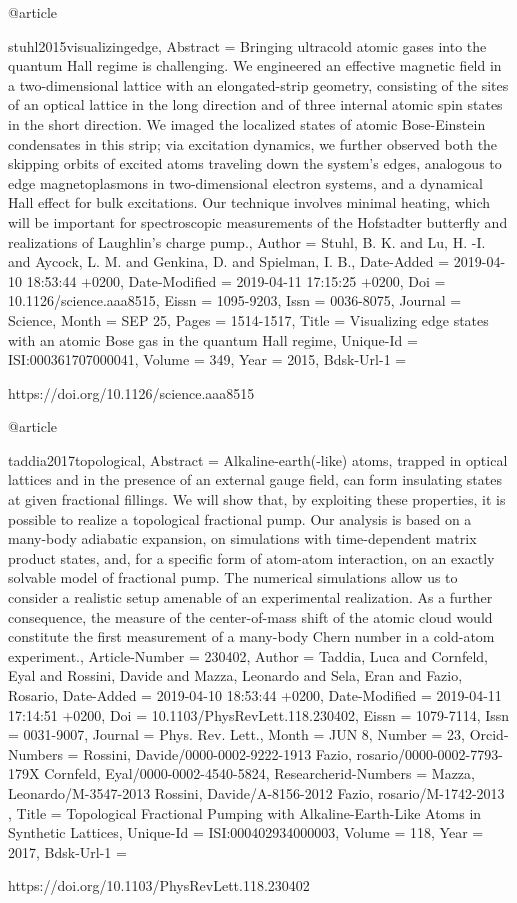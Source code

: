 \documentclass[epj,final]{svjour}
\begin{document}
{{{{{{{{{{{{{@article{stuhl2015visualizingedge,
	Abstract = {{Bringing ultracold atomic gases into the quantum Hall regime is
   challenging. We engineered an effective magnetic field in a
   two-dimensional lattice with an elongated-strip geometry, consisting of
   the sites of an optical lattice in the long direction and of three
   internal atomic spin states in the short direction. We imaged the
   localized states of atomic Bose-Einstein condensates in this strip; via
   excitation dynamics, we further observed both the skipping orbits of
   excited atoms traveling down the system's edges, analogous to edge
   magnetoplasmons in two-dimensional electron systems, and a dynamical
   Hall effect for bulk excitations. Our technique involves minimal
   heating, which will be important for spectroscopic measurements of the
   Hofstadter butterfly and realizations of Laughlin's charge pump.}},
	Author = {Stuhl, B. K. and Lu, H. -I. and Aycock, L. M. and Genkina, D. and Spielman, I. B.},
	Date-Added = {2019-04-10 18:53:44 +0200},
	Date-Modified = {2019-04-11 17:15:25 +0200},
	Doi = {{10.1126/science.aaa8515}},
	Eissn = {{1095-9203}},
	Issn = {{0036-8075}},
	Journal = {Science},
	Month = {{SEP 25}},
	Pages = {{1514-1517}},
	Title = {{Visualizing edge states with an atomic Bose gas in the quantum Hall regime}},
	Unique-Id = {{ISI:000361707000041}},
	Volume = {{349}},
	Year = {{2015}},
	Bdsk-Url-1 = {https://doi.org/10.1126/science.aaa8515

@article{taddia2017topological,
	Abstract = {{Alkaline-earth(-like) atoms, trapped in optical lattices and in the
   presence of an external gauge field, can form insulating states at given
   fractional fillings. We will show that, by exploiting these properties,
   it is possible to realize a topological fractional pump. Our analysis is
   based on a many-body adiabatic expansion, on simulations with
   time-dependent matrix product states, and, for a specific form of
   atom-atom interaction, on an exactly solvable model of fractional pump.
   The numerical simulations allow us to consider a realistic setup
   amenable of an experimental realization. As a further consequence, the
   measure of the center-of-mass shift of the atomic cloud would constitute
   the first measurement of a many-body Chern number in a cold-atom
   experiment.}},
	Article-Number = {{230402}},
	Author = {Taddia, Luca and Cornfeld, Eyal and Rossini, Davide and Mazza, Leonardo and Sela, Eran and Fazio, Rosario},
	Date-Added = {2019-04-10 18:53:44 +0200},
	Date-Modified = {2019-04-11 17:14:51 +0200},
	Doi = {{10.1103/PhysRevLett.118.230402}},
	Eissn = {{1079-7114}},
	Issn = {{0031-9007}},
	Journal = {Phys. Rev. Lett.},
	Month = {{JUN 8}},
	Number = {{23}},
	Orcid-Numbers = {{Rossini, Davide/0000-0002-9222-1913 Fazio, rosario/0000-0002-7793-179X Cornfeld, Eyal/0000-0002-4540-5824}},
	Researcherid-Numbers = {{Mazza, Leonardo/M-3547-2013 Rossini, Davide/A-8156-2012 Fazio, rosario/M-1742-2013 }},
	Title = {{Topological Fractional Pumping with Alkaline-Earth-Like Atoms in Synthetic Lattices}},
	Unique-Id = {{ISI:000402934000003}},
	Volume = {{118}},
	Year = {{2017}},
	Bdsk-Url-1 = {https://doi.org/10.1103/PhysRevLett.118.230402

}}}}}}}}}}}}}}}}}
\end{document}
